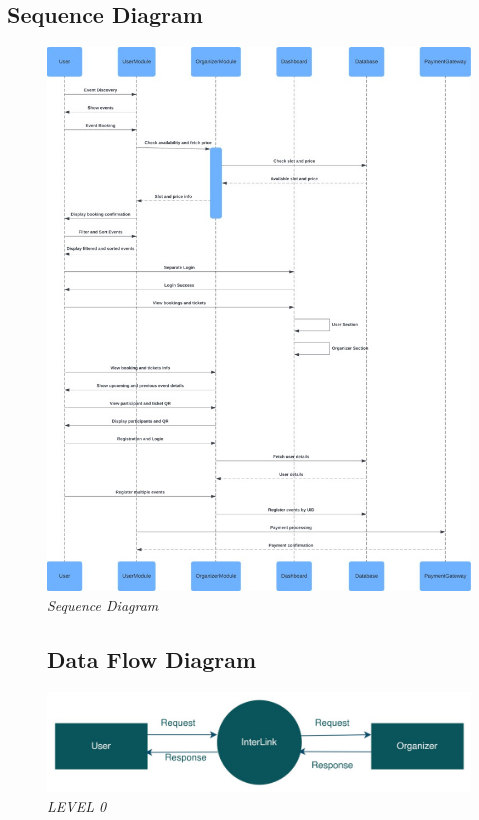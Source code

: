 \documentclass[twoside,a4paper,openright]{report} %
\begin{document}
\subsection{Sequence Diagram}
\begin{figure}[H]
	\centering
	\includegraphics[scale=0.50]{sequence.jpg}   
	\caption{\textit{Sequence Diagram}}
	\label{Sequence Diagram}    
\end{figure}


\begin{figure}[H]
	\subsection{Data Flow Diagram}
	\hspace{2cm}
	\includegraphics[width=\textwidth]{dfd1.jpg}
	\caption{\textit{LEVEL 0}}
\end{figure}
\end{document}
